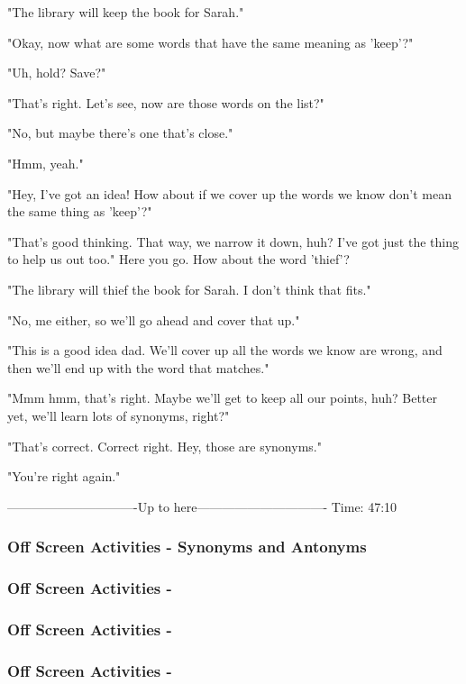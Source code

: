 "The library will keep the book for Sarah."

"Okay, now what are some words that have the same meaning as 'keep'?"

"Uh, hold? Save?"

"That's right.
Let's see, now are those words on the list?"

"No, but maybe there's one that's close."

"Hmm, yeah."

"Hey, I've got an idea!
How about if we cover up the words we know don't mean the same thing as 'keep'?"

"That's good thinking.
That way, we narrow it down, huh?
I've got just the thing to help us out too."
Here you go.
How about the word 'thief'?

"The library will thief the book for Sarah.
I don't think that fits."

"No, me either, so we'll go ahead and cover that up."

"This is a good idea dad. We'll cover up all the words we know are wrong, and then we'll end up with the word that matches."

"Mmm hmm, that's right. Maybe we'll get to keep all our points, huh?
Better yet, we'll learn lots of synonyms, right?"

"That's correct. Correct right. Hey, those are synonyms."

"You're right again."

-------------------------------Up to here-------------------------------
Time: 47:10

\subsubsection{Off Screen Activities - Synonyms and Antonyms}

\subsubsection{Off Screen Activities - }

\subsubsection{Off Screen Activities - }

\subsubsection{Off Screen Activities - }

